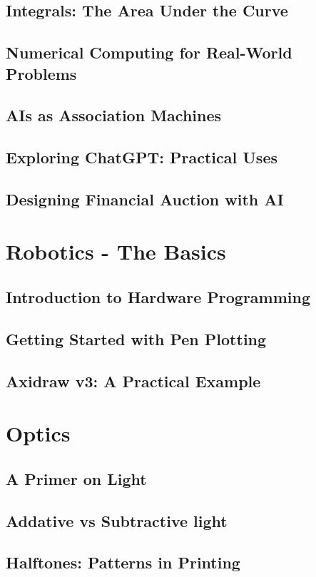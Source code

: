 \section{Integrals: The Area Under the Curve}
\section{Numerical Computing for Real-World Problems}
\section{AIs as Association Machines}
\section{Exploring ChatGPT: Practical Uses}
\section{Designing Financial Auction with AI}

\chapter{Robotics - The Basics}
\section{Introduction to Hardware Programming}
\section{Getting Started with Pen Plotting}
\section{Axidraw v3: A Practical Example}

\chapter{Optics}
\section{A Primer on Light}
\section{Addative vs Subtractive light}
\section{Halftones: Patterns in Printing}
